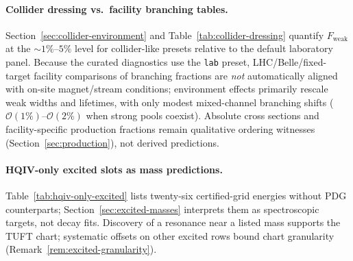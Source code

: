 \documentclass[11pt]{amsart}
\begin{document}
\paragraph{Collider dressing vs.\ facility branching tables.}
Section~\ref{sec:collider-environment} and Table~\ref{tab:collider-dressing}
quantify $F_{\mathrm{weak}}$ at the $\sim 1\%$--$5\%$ level for collider-like
presets relative to the default laboratory panel.
Because the curated diagnostics use the \texttt{lab} preset, LHC/Belle/fixed-target
facility comparisons of branching fractions are \emph{not} automatically aligned
with on-site magnet/stream conditions; environment effects primarily rescale weak
widths and lifetimes, with only modest mixed-channel branching shifts
($\mathcal{O}(1\%)$--$\mathcal{O}(2\%)$ when strong pools coexist).
Absolute cross sections and facility-specific production fractions remain
qualitative ordering witnesses (Section~\ref{sec:production}), not derived
predictions.

\paragraph{HQIV-only excited slots as mass predictions.}
Table~\ref{tab:hqiv-only-excited} lists twenty-six certified-grid energies without PDG
counterparts; Section~\ref{sec:excited-masses} interprets them as spectroscopic
targets, not decay fits.
Discovery of a resonance near a listed mass supports the TUFT chart; systematic
offsets on other excited rows bound chart granularity
(Remark~\ref{rem:excited-granularity}).
\end{document}
